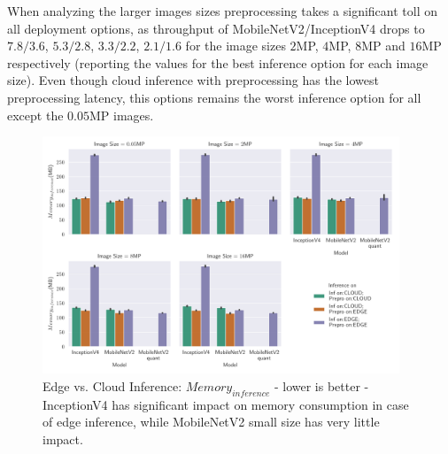 When analyzing the larger images sizes preprocessing takes a significant toll on all deployment options, as throughput of MobileNetV2/InceptionV4 drops to $7.8/3.6$, $5.3/2.8$, $3.3/2.2$, $2.1/1.6$ for the image sizes $2$MP, $4$MP, $8$MP and $16$MP respectively (reporting the values for the best inference option for each image size).
Even though cloud inference with preprocessing has the lowest preprocessing latency, this options remains the worst inference option for all except the $0.05$MP images.

\begin{figure}[!htb]
\centering
\includegraphics[width=0.95\textwidth]{./Bilder/single_plots/edge_vs_cloud_plots/Edge_vs_Cloud_Inference_Inference_Memory.pdf}
\caption[{Edge vs. Cloud Inference:  $Memory_{inference}$ - lower is better}]{Edge vs. Cloud Inference:  $Memory_{inference}$ - lower is better - InceptionV4 has significant impact on memory consumption in case of edge inference, while MobileNetV2 small size has very little impact.}
\label{fig:EdgeVsCloudInferenceMemory}
\end{figure}

